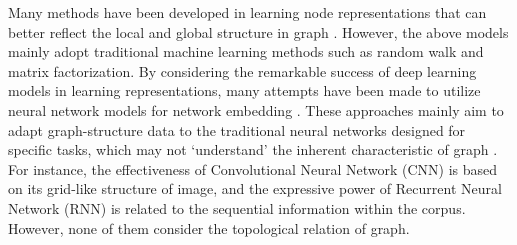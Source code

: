 
Many methods have been developed in learning node representations that can better reflect the local and global structure in graph \cite{caos2015learninggraphrepresentations, du2021tabularnet, yu2020structured}. 
%
However, the above models mainly adopt traditional machine learning methods such as random walk and matrix factorization. 
%
By considering the remarkable success of deep learning models in learning representations, many attempts have been made to utilize neural network models for network embedding \cite{wang2016structural, cao2016deep, he2019content}. 
%
These approaches mainly aim to adapt graph-structure data to the traditional neural networks designed for specific tasks, which may not ‘understand’ the inherent characteristic of graph \cite{velivckovic2017graph}. 
%
For instance, the effectiveness of Convolutional Neural Network (CNN) is based on its grid-like structure of image, and the expressive power of Recurrent Neural Network (RNN) \cite{lipton2015critical} is related to the sequential information within the corpus. %
%
However, none of them consider the topological relation of graph.



